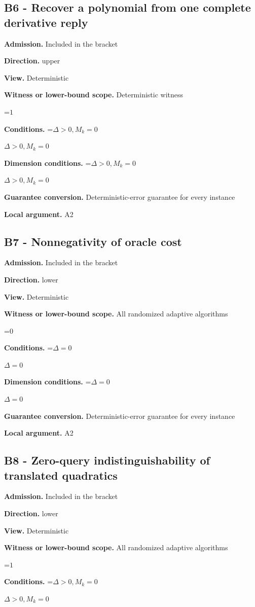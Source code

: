 \documentclass[10pt,a4paper]{article}
\newcommand{\AtlasMath}[1]{\par\begingroup\centering\setbox0=\hbox{$\displaystyle #1$}\ifdim\wd0>1.4\linewidth\typeout{ATLAS WIDE FORMULA: \the\wd0}\fi\ifdim\wd0>\linewidth\resizebox{\linewidth}{!}{\box0}\else\box0\fi\par\endgroup}
\newcommand{\AtlasInlineMath}[1]{\begingroup\setbox0=\hbox{$#1$}\ifdim\wd0>.4\linewidth\endgroup\AtlasMath{#1}\else\endgroup$#1$\fi}
\begin{document}
\subsection{B6 - Recover a polynomial from one complete derivative reply}
\textbf{Admission.} Included in the bracket

\textbf{Direction.} upper

\textbf{View.} Deterministic

\textbf{Witness or lower-bound scope.} Deterministic witness

\AtlasMath{1}
\textbf{Conditions.} \AtlasInlineMath{\Delta>0, M_k=0}

\textbf{Dimension conditions.} \AtlasInlineMath{\Delta>0, M_k=0}

\textbf{Guarantee conversion.} Deterministic-error guarantee for every instance

\textbf{Local argument.} A2

\subsection{B7 - Nonnegativity of oracle cost}
\textbf{Admission.} Included in the bracket

\textbf{Direction.} lower

\textbf{View.} Deterministic

\textbf{Witness or lower-bound scope.} All randomized adaptive algorithms

\AtlasMath{0}
\textbf{Conditions.} \AtlasInlineMath{\Delta=0}

\textbf{Dimension conditions.} \AtlasInlineMath{\Delta=0}

\textbf{Guarantee conversion.} Deterministic-error guarantee for every instance

\textbf{Local argument.} A2

\subsection{B8 - Zero-query indistinguishability of translated quadratics}
\textbf{Admission.} Included in the bracket

\textbf{Direction.} lower

\textbf{View.} Deterministic

\textbf{Witness or lower-bound scope.} All randomized adaptive algorithms

\AtlasMath{1}
\textbf{Conditions.} \AtlasInlineMath{\Delta>0, M_k=0}
\end{document}
